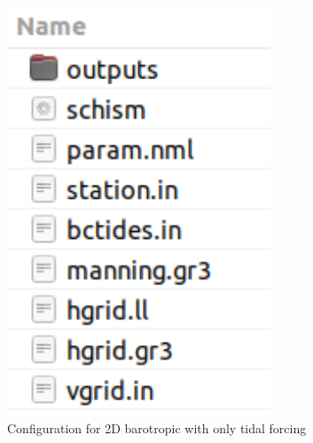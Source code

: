 \documentclass[preprints,briefreport,accept,oneauthor,pdftex]{Definitions/mdpi}
\begin{document}
\begin{figure}
    \centering
    \begin{minipage}[b]{0.45\textwidth}
        \includegraphics[width=0.7\textwidth]{figures/configsimple.png}
    \caption{Configuration for 2D barotropic with only tidal forcing}
    \label{fig:configS}
    \end{minipage}
\hfill
    \begin{minipage}[b]{0.45\textwidth}
    \centering

\end{minipage}
\end{figure}
\end{document}
